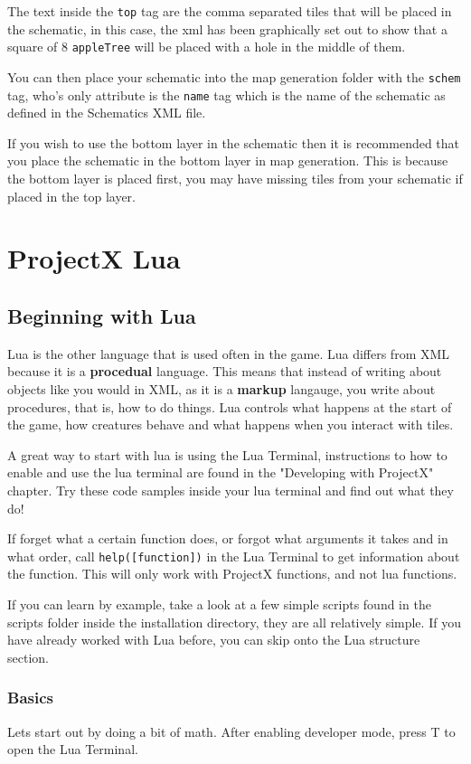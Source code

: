 \documentclass{book}
\begin{document}
The text inside the \texttt{top} tag are the comma separated tiles that will be placed in the schematic, in this case, the xml has been graphically set out to show that a square of 8 \texttt{appleTree} will be placed with a hole in the middle of them.

You can then place your schematic into the map generation folder with the \texttt{schem} tag, who's only attribute is the \texttt{name} tag which is the name of the schematic as defined in the Schematics XML file.

If you wish to use the bottom layer in the schematic then it is recommended that you place the schematic in the bottom layer in map generation. This is because the bottom layer is placed first, you may have missing tiles from your schematic if placed in the top layer.

\chapter{ProjectX Lua}
\section{Beginning with Lua}
Lua is the other language that is used often in the game. Lua differs from XML because it is a \textbf{procedual} language. This means that instead of writing about objects like you would in XML, as it is a \textbf{markup} langauge, you write about procedures, that is, how to do things. Lua controls what happens at the start of the game, how creatures behave and what happens when you interact with tiles.

A great way to start with lua is using the Lua Terminal, instructions to how to enable and use the lua terminal are found in the "Developing with ProjectX" chapter. Try these code samples inside your lua terminal and find out what they do!

If forget what a certain function does, or forgot what arguments it takes and in what order, call \texttt{help([function])} in the Lua Terminal to get information about the function. This will only work with ProjectX functions, and not lua functions. 

If you can learn by example, take a look at a few simple scripts found in the scripts folder inside the installation directory, they are all relatively simple. If you have already worked with Lua before, you can skip onto the Lua structure section.  

\subsection{Basics}
Lets start out by doing a bit of math. After enabling developer mode, press T to open the Lua Terminal.
\end{document}
